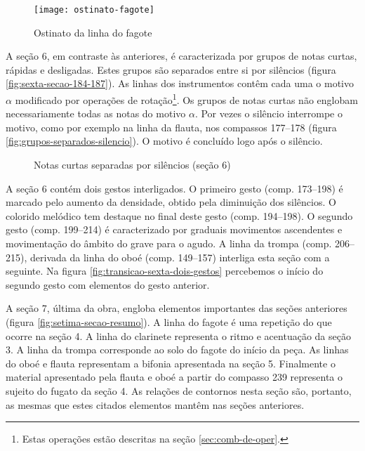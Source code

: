 \begin{figure}
  \centering
  \texttt{[image: ostinato-fagote]}
  \caption{Ostinato da linha do fagote}
  \label{fig:ostinato-fagote}
\end{figure}

A seção 6, em contraste às anteriores, é caracterizada por grupos de
notas curtas, rápidas e desligadas. Estes grupos são separados entre
si por silêncios (figura \ref{fig:sexta-secao-184-187}). As linhas dos
instrumentos contêm cada uma o motivo $\alpha$ modificado por
operações de rotação\footnote{Estas operações estão descritas na seção
  \ref{sec:comb-de-oper}.}. Os grupos de notas curtas não englobam
necessariamente todas as notas do motivo $\alpha$. Por vezes o
silêncio interrompe o motivo, como por exemplo na linha da flauta, nos
compassos 177--178 (figura \ref{fig:grupos-separados-silencio}). O
motivo é concluído logo após o silêncio.

\begin{figure}
  \centering


  \caption{Notas curtas separadas por silêncios (seção 6)}
  \label{fig:sexta-secao-notas-curtas}
\end{figure}

A seção 6 contém dois gestos interligados. O primeiro gesto
(comp. 173--198) é marcado pelo aumento da densidade, obtido pela
diminuição dos silêncios. O colorido melódico tem destaque no final
deste gesto (comp. 194--198). O segundo gesto (comp. 199--214) é
caracterizado por graduais movimentos ascendentes e movimentação do
âmbito do grave para o agudo. A linha da trompa (comp. 206--215),
derivada da linha do oboé (comp. 149--157) interliga esta seção com a
seguinte. Na figura \ref{fig:transicao-sexta-dois-gestos} percebemos o
início do segundo gesto com elementos do gesto anterior.

A seção 7, última da obra, engloba elementos importantes das seções
anteriores (figura \ref{fig:setima-secao-resumo}). A linha do fagote é
uma repetição do que ocorre na seção 4. A linha do clarinete
representa o ritmo e acentuação da seção 3. A linha da trompa
corresponde ao solo do fagote do início da peça. As linhas do oboé e
flauta representam a bifonia apresentada na seção 5. Finalmente o
material apresentado pela flauta e oboé a partir do compasso 239
representa o sujeito do fugato da seção 4. As relações de contornos
nesta seção são, portanto, as mesmas que estes citados elementos
mantêm nas seções anteriores.

